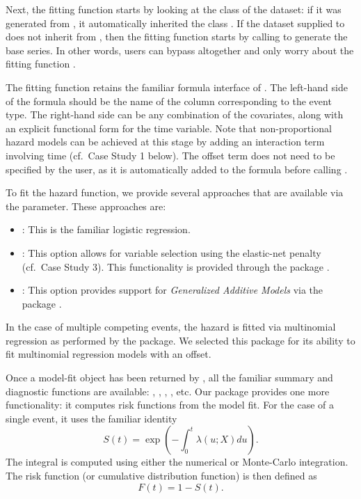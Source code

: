 Next, the fitting function  starts by looking at
the class of the dataset: if it was generated from
, it automatically inherited the class
. If the dataset supplied to  does
not inherit from , then the fitting function starts by
calling  to generate the base series. In other
words, users can bypass  altogether and only worry
about the fitting function .

The fitting function retains the familiar formula interface of
. The left-hand side of the formula should be the name of the
column corresponding to the event type. The right-hand side can be any
combination of the covariates, along with an explicit functional form
for the time variable. Note that non-proportional hazard models can be
achieved at this stage by adding an interaction term involving time
(cf.~Case Study 1 below). The offset term does not need to be specified
by the user, as it is automatically added to the formula before calling
.

To fit the hazard function, we provide several approaches that are
available via the  parameter. These approaches are:

\begin{itemize}
\tightlist
\item
  : This is the familiar logistic regression.
\item
  : This option allows for variable selection using the
  elastic-net \citep{zou2005regularization} penalty (cf.~Case Study 3).
  This functionality is provided through the  package
  \citep{friedman2010jss}.
\item
  : This option provides support for \emph{Generalized
  Additive Models} via the  package
  \citep{hastie1987generalized}.
\end{itemize}

In the case of multiple competing events, the hazard is fitted via
multinomial regression as performed by the  package. We
selected this package for its ability to fit multinomial regression
models with an offset.

Once a model-fit object has been returned by , all
the familiar summary and diagnostic functions are available:
, , , , etc. Our
package provides one more functionality: it computes risk functions from
the model fit. For the case of a single event, it uses the familiar
identity \begin{equation}\label{eqn:surv}
S(t) = \exp\left(-\int_0^t \lambda(u;X) du\right).
\end{equation} The integral is computed using either the numerical or
Monte-Carlo integration. The risk function (or cumulative distribution
function) is then defined as \begin{equation}\label{eqn:CDF}
F(t) = 1 - S(t).
\end{equation}

